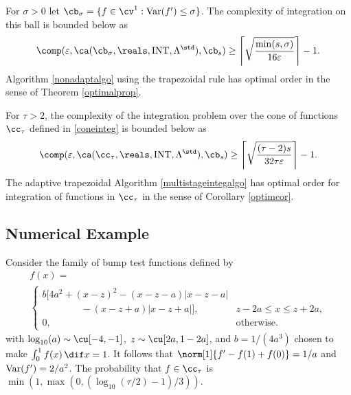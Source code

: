 \begin{theorem} \label{complowbdinteg} For $\sigma>0$ let $\cb_{\sigma}=\{f \in \cv^{1} : \Var(f') \le \sigma\}$.  The complexity of integration on this ball is bounded below as
\begin{equation*}
\comp(\varepsilon,\ca(\cb_{\sigma},\reals,\INT,\Lambda^{\std}),\cb_{s}) \ge \left \lceil \sqrt{\frac{\min(s,\sigma)}{16 \varepsilon}} \right \rceil -1 .
\end{equation*}
Algorithm \ref{nonadaptalgo} using the trapezoidal rule has optimal order in the sense of Theorem \ref{optimalprop}.

For $\tau>2$, the complexity of the integration problem over the cone of functions $\cc_{\tau}$ defined in \eqref{coneinteg} is bounded below as
\begin{equation*}
\comp(\varepsilon,\ca(\cc_{\tau},\reals,\INT,\Lambda^{\std}),\cb_{s}) \ge \left \lceil \sqrt{\frac{(\tau-2)s}{32 \tau \varepsilon}} \right \rceil -1 .
\end{equation*}
The adaptive trapezoidal Algorithm \ref{multistageintegalgo} has optimal order for integration of functions in $\cc_{\tau}$ in the sense of Corollary \ref{optimcor}.
\end{theorem}

\subsection{Numerical Example} \label{integnumexamplesec}

Consider the family of bump test functions defined by
\begin{multline}\label{testfun}
f(x)= \\
\begin{cases}
\displaystyle  b[4a^2 + (x-z)^2-(x-z-a)|x-z-a|\\
\qquad \qquad -(x-z+a)|x-z+a|], & z-2a\leq x\leq z+2a,\\[2ex]
\displaystyle  0, & \text{otherwise}.
\end{cases}
\end{multline}
with  $\log_{10}(a) \sim \cu[-4,-1]$, $z \sim \cu[2a,1-2a]$, and $b=1/(4a^3)$ chosen to make $\int_0^1 f(x) \, \dif x = 1$.  It follows that $\norm[1]{f'-f(1)+f(0)}=1/a$ and $\operatorname{Var}(f')=2/a^2$.  The probability that $f \in \cc_{\tau}$ is $\min\left(1,\max(0,\left(\log_{10}(\tau/2)-1\right)/3)\right).$

